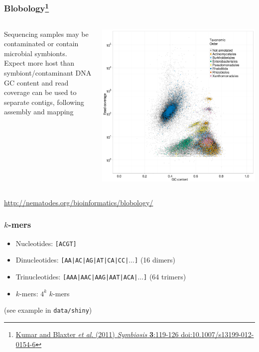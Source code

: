 \begin{frame}
  \frametitle{Blobology\footnote{\tiny{\href{http://dx.doi.org/10.1007/s13199-012-0154-6}{Kumar and Blaxter \textit{et al}. (2011) \textit{Symbiosis} \textbf{3}:119-126 doi:10.1007/s13199-012-0154-6}}}}
  \begin{columns}[T]
    \begin{column}{5cm}
      Sequencing samples may be contaminated or contain microbial symbionts.\\[0.2cm]
      Expect more host than symbiont/contaminant DNA\\[0.2cm]
      GC content and read coverage can be used to separate contigs, following assembly and mapping
    \end{column}
    \begin{column}{5cm}
      \includegraphics[width=1\textwidth]{images/blobology}
    \end{column}
  \end{columns}
  \href{http://nematodes.org/bioinformatics/blobology/}{http://nematodes.org/bioinformatics/blobology/}
\end{frame}

\begin{frame}
  \frametitle{$k$-mers}
     \begin{itemize}
       \item Nucleotides: \texttt{[ACGT]}
       \item Dinucleotides: \texttt{[AA|AC|AG|AT|CA|CC|$\ldots$]} (16 dimers)
       \item Trinucleotides: \texttt{[AAA|AAC|AAG|AAT|ACA|$\ldots$]} (64 trimers)
       \item $k$-mers: $4^k$ $k$-mers
     \end{itemize}
     (see example in \texttt{data/shiny})
\end{frame}

